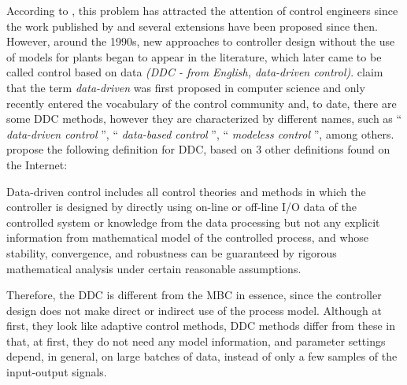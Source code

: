 According to \cite{campi2002}, this problem has attracted the attention of control engineers since the work published by \cite{ziegler1942} and several extensions have been proposed since then. However, around the 1990s, new approaches to controller design without the use of models for plants began to appear in the literature, which later came to be called control based on data \emph{(DDC - from English, data-driven control)}.
%
\cite{hou2013} claim that the term \emph{data-driven} was first proposed in computer science and only recently entered the vocabulary of the control community and, to date, there are some DDC methods, however they are characterized by different names, such as `` \emph{data-driven control} '', `` \emph{data-based control} '', `` \emph{modeless control} '', among others. \cite{hou2013} propose the following definition for DDC, based on 3 other definitions found on the Internet:

\begin{defn}\citep{hou2013}
Data-driven control includes all control theories and methods in which the controller is designed by directly using on-line or off-line I/O data of the controlled system or knowledge from the data processing but not any explicit information from mathematical model of the controlled process, and whose stability, convergence, and robustness can be guaranteed by rigorous mathematical analysis under certain reasonable assumptions.
\end{defn}


Therefore, the DDC is different from the MBC in essence, since the controller design does not make direct or indirect use of the process model.  
Although at first, they look like adaptive control methods, DDC methods differ from these in that, at first, they do not need any model information, and parameter settings depend, in general, on large batches of data, instead of only a few samples of the input-output signals. %


